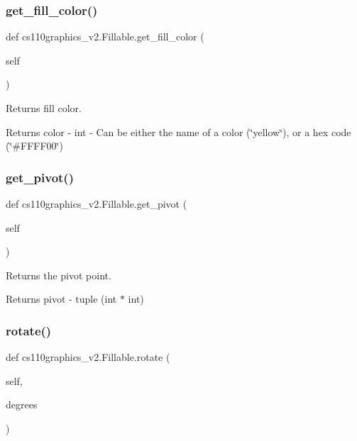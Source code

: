 \subsubsection{\texorpdfstring{get\_fill\_color()}{get\_fill\_color()}}
{\footnotesize\ttfamily def cs110graphics\+\_\+v2.\+Fillable.\+get\+\_\+fill\+\_\+color (\begin{DoxyParamCaption}\item[{}]{self }\end{DoxyParamCaption})}



Returns fill color. 

\begin{DoxyReturn}{Returns}
color -\/ int -\/ Can be either the name of a color (\char`\"{}yellow\char`\"{}), or a hex code (\char`\"{}\#\+F\+F\+F\+F00\char`\"{}) 
\end{DoxyReturn}
\mbox{\label{classcs110graphics__v2_1_1Fillable_a098238caa8fec93e7510bd271f7813a5}} 
\subsubsection{\texorpdfstring{get\_pivot()}{get\_pivot()}}
{\footnotesize\ttfamily def cs110graphics\+\_\+v2.\+Fillable.\+get\+\_\+pivot (\begin{DoxyParamCaption}\item[{}]{self }\end{DoxyParamCaption})}



Returns the pivot point. 

\begin{DoxyReturn}{Returns}
pivot -\/ tuple (int $\ast$ int) 
\end{DoxyReturn}
\mbox{\label{classcs110graphics__v2_1_1Fillable_aee03142975056e9f3cbd5b7b5f81bcb7}} 
\subsubsection{\texorpdfstring{rotate()}{rotate()}}
{\footnotesize\ttfamily def cs110graphics\+\_\+v2.\+Fillable.\+rotate (\begin{DoxyParamCaption}\item[{}]{self,  }\item[{}]{degrees }\end{DoxyParamCaption})}




